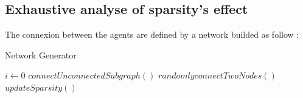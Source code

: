 \documentclass[a4paper,10pt]{article}
\begin{document}
\begin{table}[h]
\end{table}%

\subsection{Exhaustive analyse of sparsity's effect}
The connexion between the agents are defined by a network builded as follow :
\begin{algorithm}
\caption{Network Generator}\label{alg:netGen}
\begin{algorithmic}

\STATE $i\gets 0$
\STATE $connectUnconnectedSubgraph()$
\ELSE
\STATE $randomlyconnectTwoNodes()$
\ENDIF
\STATE $updateSparsity()$
\ENDWHILE
\end{algorithmic}
\end{algorithm}
\end{document}
